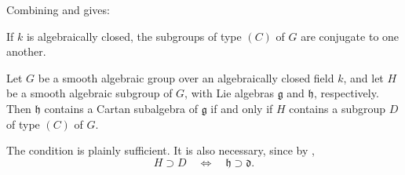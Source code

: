 Combining  and  gives:

\begin{corollary}
If \(k\) is algebraically closed, the subgroups of type \((C)\) of
\(G\) are conjugate to one another.
\end{corollary}

\begin{corollary}
Let \(G\) be a smooth algebraic group over an algebraically closed
field \(k\), and let \(H\) be a smooth algebraic subgroup of \(G\),
with Lie algebras \(\mathfrak g\) and \(\mathfrak h\), respectively.
Then \(\mathfrak h\) contains a Cartan subalgebra of \(\mathfrak g\)
if and only if \(H\) contains a subgroup \(D\) of type \((C)\) of
\(G\).
\end{corollary}

The condition is plainly sufficient. It is also necessary, since by
,
\[
  H\supset D
  \quad\Longleftrightarrow\quad
  \mathfrak h\supset\mathfrak d.
\]

